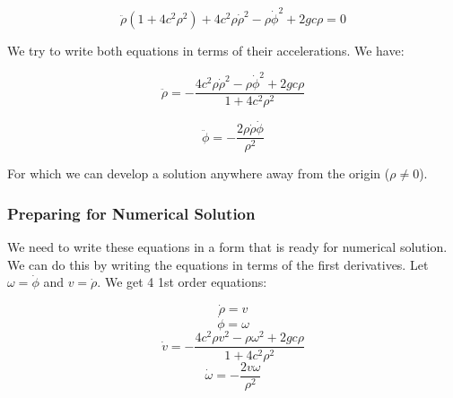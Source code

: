 \documentclass[11pt]{article}
\begin{document}
\[\ddot{\rho}(1+4c^2\rho^2) + 4c^2\rho\dot{\rho}^2 - \rho\dot{\phi}^2 + 2gc\rho = 0\]

We try to write both equations in terms of their accelerations. We have:

\[\ddot{\rho} = -\dfrac{4c^2\rho\dot{\rho}^2 - \rho\dot{\phi}^2 + 2gc\rho}{1+4c^2\rho^2}\]

\[\ddot{\phi} = - \dfrac{2\rho\dot{\rho}\dot{\phi}}{\rho^2}\]

For which we can develop a solution anywhere away from the origin
(\(\rho \neq 0\)).

\subsubsection{Preparing for Numerical
Solution}\label{preparing-for-numerical-solution}

We need to write these equations in a form that is ready for numerical
solution. We can do this by writing the equations in terms of the first
derivatives. Let \(\omega = \dot{\phi}\) and \(v = \dot{\rho}\). We get
4 1st order equations:

\[\dot{\rho} = v\] \[\dot{\phi} = \omega\]
\[\dot{v} = -\dfrac{4c^2\rho v^2 - \rho\omega^2 + 2gc\rho}{1+4c^2\rho^2}\]
\[\dot{\omega} = - \dfrac{2 v\omega}{\rho^2}\]

    


    
    
    
\end{document}
